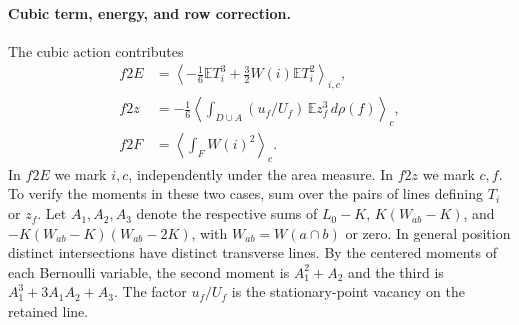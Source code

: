 \paragraph{Cubic term, energy, and row correction.} The cubic action contributes \begin{align*}
 f2E&=\left\langle-\tfrac16\mathbb E T_i^3+\tfrac32 W(i)\mathbb E T_i^2\right\rangle_{i,c},\\
 f2z&=-\tfrac16\left\langle\int_{D\cup A}(u_f/U_f)\,\mathbb E z_f^3\,d\rho(f)\right\rangle_c,\\
 f2F&=\left\langle\int_F W(i)^2\right\rangle_c .
\end{align*} In \(f2E\) we mark \(i,c\), independently under the area measure. In \(f2z\) we mark
\(c,f\). To verify the moments in these two cases, sum over the pairs of lines defining \(T_i\) or
\(z_f\). Let \(A_1,A_2,A_3\) denote the respective sums of \(L_0-K\), \(K(W_{ab}-K)\), and
\(-K(W_{ab}-K)(W_{ab}-2K)\), with \(W_{ab}=W(a\cap b)\) or zero. In general position distinct
intersections have distinct transverse lines. By the centered moments of each Bernoulli variable, the
second moment is \(A_1^2+A_2\) and the third is \(A_1^3+3A_1A_2+A_3\). The factor \(u_f/U_f\) is the
stationary-point vacancy on the retained line.

